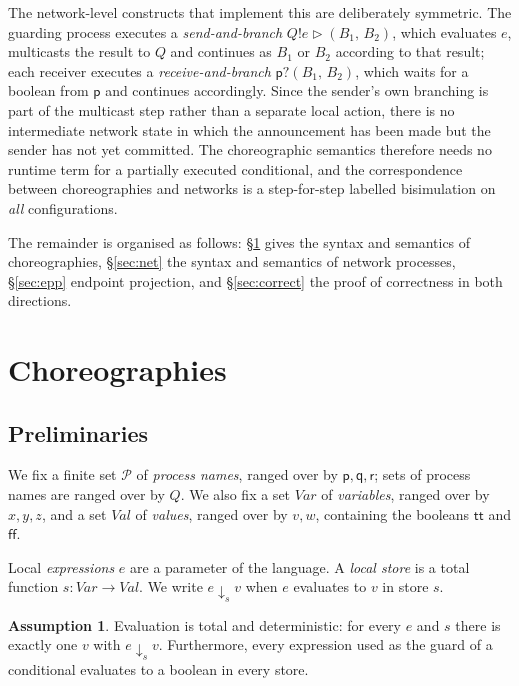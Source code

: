 \documentclass[11pt]{article}
\theoremstyle{plain}
\theoremstyle{definition}
\newtheorem{assumption}[theorem]{Assumption}
\theoremstyle{remark}
\newcommand{\ttrue}{\mathsf{tt}}
\newcommand{\ffalse}{\mathsf{ff}}
\newcommand{\pp}{\mathsf{p}}
\newcommand{\qq}{\mathsf{q}}
\newcommand{\rr}{\mathsf{r}}
\newcommand{\Procs}{\mathcal{P}}
\newcommand{\Var}{\mathit{Var}}
\newcommand{\Val}{\mathit{Val}}
\newcommand{\eval}[3]{#1 \downarrow_{#2} #3}
\newcommand{\sendbr}[4]{#1!#2 \mathbin{\triangleright} (#3,\, #4)}
\newcommand{\recvbr}[3]{#1?(#2,\, #3)}
\begin{document}
The network-level constructs that implement this are deliberately symmetric.
The guarding process executes a \emph{send-and-branch}
$\sendbr{Q}{e}{B_1}{B_2}$, which evaluates $e$, multicasts the result to $Q$
and continues as $B_1$ or $B_2$ according to that result; each receiver
executes a \emph{receive-and-branch} $\recvbr{\pp}{B_1}{B_2}$, which waits for
a boolean from $\pp$ and continues accordingly.  Since the sender's own
branching is part of the multicast step rather than a separate local action,
there is no intermediate network state in which the announcement has been
made but the sender has not yet committed.  The choreographic semantics
therefore needs no runtime term for a partially executed conditional, and
the correspondence between choreographies and networks is a step-for-step
labelled bisimulation on \emph{all} configurations.

The remainder is organised as follows: \S\ref{sec:chor} gives the syntax and
semantics of choreographies, \S\ref{sec:net} the syntax and semantics of
network processes, \S\ref{sec:epp} endpoint projection, and
\S\ref{sec:correct} the proof of correctness in both directions.

\section{Choreographies}
\label{sec:chor}

\subsection{Preliminaries}

We fix a finite set $\Procs$ of \emph{process names}, ranged over by
$\pp,\qq,\rr$; sets of process names are ranged over by $Q$.  We also fix a
set $\Var$ of \emph{variables}, ranged over by $x,y,z$, and a set $\Val$ of
\emph{values}, ranged over by $v,w$, containing the booleans $\ttrue$ and
$\ffalse$.

Local \emph{expressions} $e$ are a parameter of the language.  A \emph{local
store} is a total function $s : \Var \to \Val$.  We write
$\eval{e}{s}{v}$ when $e$ evaluates to $v$ in store $s$.

\begin{assumption}\label{ass:eval}
  Evaluation is total and deterministic: for every $e$ and $s$ there is exactly
  one $v$ with $\eval{e}{s}{v}$.  Furthermore, every expression used as the
  guard of a conditional evaluates to a boolean in every store.
\end{assumption}
\end{document}
